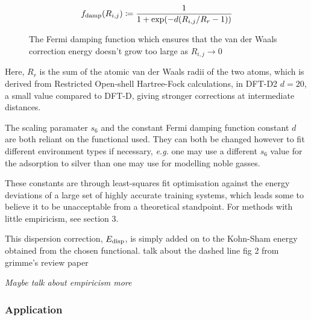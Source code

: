 \documentclass[10pt,a4paper,twocolumn,twoside]{extarticle}
\begin{document}
	\begin{align} \label{eq:damp}
		f_{\rm damp}(R_{i,j}) \coloneqq \frac{1}{1+\exp(-d(R_{i,j}/R_r -1))}
	\end{align}
	\begin{figure}
		\caption{The Fermi damping function which ensures that the van der Waals correction energy doesn't grow too large as $R_{i,j} \rightarrow 0$}
		\label{fig:Fermi}
	\end{figure}
	Here, $R_r$ is the sum of the atomic van der Waals radii of the two atoms, which is derived from Restricted Open-shell Hartree-Fock calculations, in DFT-D2 $d = 20$, a small value compared to DFT-D, giving stronger corrections at intermediate distances. 

	The scaling paramater $s_6$ and the constant Fermi damping function constant $d$ are both reliant on the functional used. They can both be changed however to fit different environment types if necessary, \emph{e.g.} one may use a different $s_6$ value for the adsorption to silver\cite{Schiavo2018} than one may use for modelling noble gasses.  

	These constants are through least-squares fit optimisation against the energy deviations of a large set of highly accurate training systems, which leads some to believe it to be unacceptable from a theoretical standpoint.\cite{Sato2009}\cite{Grimme2010}\cite{Jones2015} For methods with little empiricism, see section 3.

	This dispersion correction, $E_{\rm disp}$, is simply added on to the Kohn-Sham energy obtained from the chosen functional.
	\color{red}talk about the dashed line fig 2 from grimme's review paper \color{black}

	\emph{Maybe talk about empiricism more}
	\subsubsection{Application}
\end{document}
